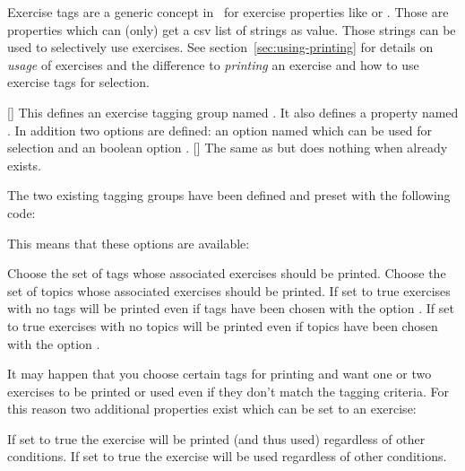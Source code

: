 \documentclass{xsim-manual}
\begin{document}
Exercise tags are a generic concept in \xsim\ for exercise properties like
 or .  Those are properties which can (only)
get a csv list of strings as value.  Those strings can be used to selectively
use exercises.  See section~\vref{sec:using-printing} for details on
\emph{usage} of exercises and the difference to \emph{printing} an exercise
and how to use exercise tags for selection.
\begin{commands}
  []
    This defines an exercise tagging group named .  It also defines a
    property named .  In addition two options are defined: an option
    named  which can be used for selection and an boolean
    option .
  []
    The same as  but does
    nothing when  already exists.
\end{commands}
The two existing tagging groups have been defined and preset with the
following code:
\begin{sourcecode}
\end{sourcecode}
This means that these options are available:
\begin{options}
    Choose the set of tags whose associated exercises should be printed.
    Choose the set of topics whose associated exercises should be printed.
    If set to true exercises with no tags will be printed even if tags have
    been chosen with the option .
    If set to true exercises with no topics will be printed even if topics
    have been chosen with the option .
\end{options}

It may happen that you choose certain tags for printing and want one or two
exercises to be printed or used even if they don't match the tagging
criteria.  For this reason two additional properties exist which can be set to
an exercise:\label{property:print!}
\begin{properties}
    If set to true the exercise will be printed (and thus used) regardless of
    other conditions.
    If set to true the exercise will be used regardless of other conditions.
\end{properties}
\end{document}
